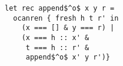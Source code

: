 \begin{lstlisting}
let rec append$^o$ x y r =
  ocanren { fresh h t r' in
    (x === [] & y === r) |
    (x === h :: x' &
     t === h :: r' &
     append$^o$ x' y r')}
\end{lstlisting}